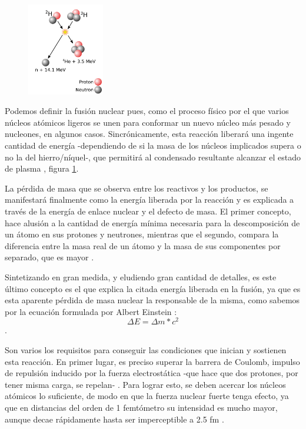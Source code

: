 \begin{figure}[hbt]
    \centering
    \includegraphics[width=0.3\textwidth]{imagenes/Deuterium-tritium_fusion.png}
    \caption{\cite{84}}
    \label{fig:fusion_reaction}
\end{figure}


Podemos definir la fusión nuclear pues, como el proceso físico por el que varios núcleos atómicos ligeros se unen para conformar un nuevo núcleo más pesado y nucleones, en algunos casos. Sincrónicamente, esta reacción liberará una ingente cantidad de energía -dependiendo de si la masa de los núcleos implicados supera o no la del hierro/níquel-, que permitirá al condensado resultante alcanzar el estado de plasma \cite{36}, figura \ref{fig:fusion_reaction}.

La pérdida de masa que se observa entre los reactivos y los productos, se manifestará finalmente como la energía liberada por la reacción y es explicada a través de la energía de enlace nuclear y el defecto de masa. El primer concepto, hace alusión a la cantidad de energía mínima necesaria para la descomposición de un átomo en sus protones y neutrones, mientras que el segundo, compara la diferencia entre la masa real de un átomo y la masa de sus componentes por separado, que es mayor \cite{37,38}. 

Sintetizando en gran medida, y eludiendo gran cantidad de detalles, es este último concepto es el que explica la citada energía liberada en la fusión, ya que es esta aparente pérdida de masa nuclear la responsable de la misma, como sabemos por la ecuación formulada por Albert Einstein \cite{39}: $$\Delta E=\Delta m * c^2$$.

Son varios los requisitos para conseguir las condiciones que inician y sostienen esta reacción. En primer lugar, es preciso superar la barrera de Coulomb, impulso de repulsión inducido por la fuerza electrostática -que hace que dos protones, por tener misma carga, se repelan- \cite{40}. Para lograr esto, se deben acercar los núcleos atómicos lo suficiente, de modo en que la fuerza nuclear fuerte tenga efecto, ya que en distancias del orden de 1 femtómetro su intensidad es mucho mayor, aunque decae rápidamente hasta ser imperceptible a 2.5 fm \cite{41}. 

